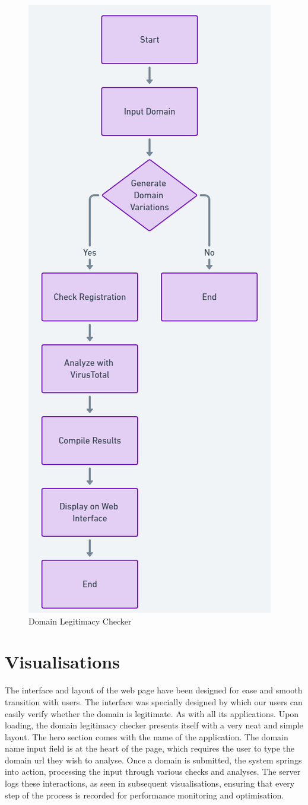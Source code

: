 \begin{figure}[H]
    \centering
    \includegraphics[width=0.6\linewidth]{project/DNS Abuse Inspector Operational Flowchart.png}
    \caption{Domain Legitimacy Checker}
    \label{fig:figfigfig}
\end{figure}
\newpage

\section{Visualisations}

The interface and layout of the web page have been designed for ease and smooth transition with users. The interface was specially designed by which our users can easily verify whether the domain is legitimate. As with all its applications. Upon loading, the domain legitimacy checker presents itself with a very neat and simple layout. The hero section comes with the name of the application. The domain name input field is at the heart of the page, which requires the user to type the domain url they wish to analyse. Once a domain is submitted, the system springs into action, processing the input through various checks and analyses. The server logs these interactions, as seen in subsequent visualisations, ensuring that every step of the process is recorded for performance monitoring and optimisation.

